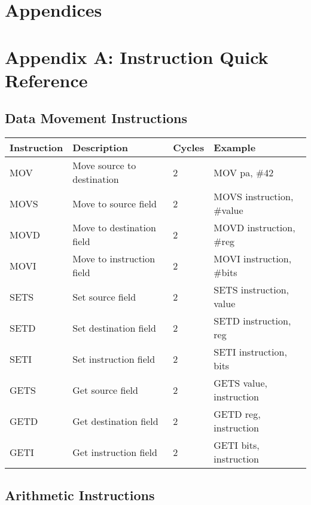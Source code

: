 \documentclass[11pt]{book}
\begin{document}
\hypertarget{appendices}{%
\section{Appendices}\label{appendices}}

\hypertarget{appendix-a-instruction-quick-reference}{%
\section{Appendix A: Instruction Quick
Reference}\label{appendix-a-instruction-quick-reference}}

\hypertarget{data-movement-instructions}{%
\subsection{Data Movement
Instructions}\label{data-movement-instructions}}

\begin{longtable}[]{@{}llll@{}}
\toprule
Instruction & Description & Cycles & Example \\
\midrule
\endhead
MOV & Move source to destination & 2 & MOV pa, \#42 \\
MOVS & Move to source field & 2 & MOVS instruction, \#value \\
MOVD & Move to destination field & 2 & MOVD instruction, \#reg \\
MOVI & Move to instruction field & 2 & MOVI instruction, \#bits \\
SETS & Set source field & 2 & SETS instruction, value \\
SETD & Set destination field & 2 & SETD instruction, reg \\
SETI & Set instruction field & 2 & SETI instruction, bits \\
GETS & Get source field & 2 & GETS value, instruction \\
GETD & Get destination field & 2 & GETD reg, instruction \\
GETI & Get instruction field & 2 & GETI bits, instruction \\
\bottomrule
\end{longtable}

\hypertarget{arithmetic-instructions}{%
\subsection{Arithmetic Instructions}\label{arithmetic-instructions}}
\end{document}
